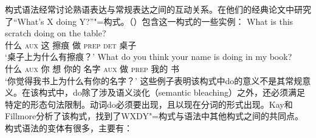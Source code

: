 构式语法经常讨论熟语表达与常规表达之间的互动关系。\citet{KF99a}在他们的经典论文中研究了“What's X doing Y?”"=构式。（）包含这一构式的一些实例：
\eal
\ex 
\gll What is this scratch doing on the table?\\
      什么 \textsc{aux} 这 擦痕 做 \textsc{prep} \textsc{det} 桌子\\
\glt `桌子上为什么有擦痕？'
\ex 
\gll What do you think your name is doing in my book?\\
      什么 \textsc{aux} 你 想 你的 名字 \textsc{aux} 做 \textsc{prep} 我的 书\\
\glt `你觉得我书上为什么有你的名字？'
\zl
这些例子表明该构式中do的意义不是其常规意义。在该构式中，do除了涉及语义淡化（semantic bleaching）之外，还必须满足特定的形态句法限制。动词do必须要出现，且以现在分词的形式出现。Kay和Fillmore分析了该构式，找到了WXDY"=构式与语法中其他构式之间的共同点。
构式语法的变体有很多，主要有：
